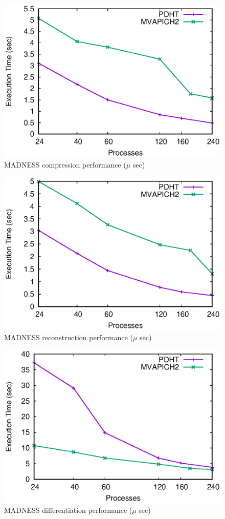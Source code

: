\begin{figure}
  \centering
  \includegraphics[width=.88\linewidth]{plots/compress}
  \caption{MADNESS compression performance ($\mu$ sec)}
  \label{fig:mad-compress}
\end{figure}

\begin{figure}
  \centering
  \includegraphics[width=.88\linewidth]{plots/reconstruct}
  \caption{MADNESS reconstruction performance ($\mu$ sec)}
  \label{fig:mad-reconstruct}
\end{figure}


\begin{figure}
  \centering
  \includegraphics[width=.88\linewidth]{plots/diff}
  \caption{MADNESS differentiation performance ($\mu$ sec)}
  \label{fig:mad-diff}
\end{figure}

